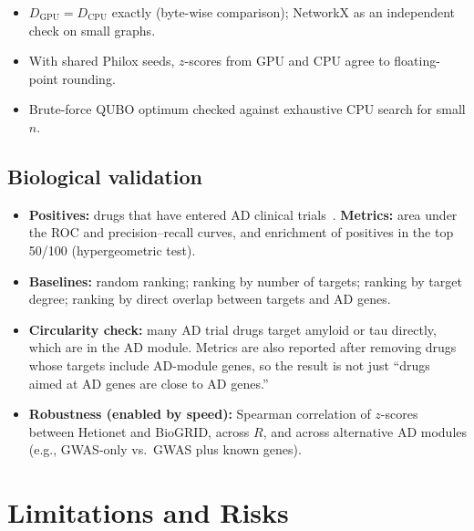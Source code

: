 \begin{itemize}[nosep]
  \item $D_{\text{GPU}} = D_{\text{CPU}}$ exactly (byte-wise comparison);
        NetworkX as an independent check on small graphs.
  \item With shared Philox seeds, $z$-scores from GPU and CPU agree to
        floating-point rounding.
  \item Brute-force QUBO optimum checked against exhaustive CPU search for
        small $n$.
\end{itemize}

\subsection{Biological validation}

\begin{itemize}[nosep]
  \item \textbf{Positives:} drugs that have entered AD clinical
        trials~\cite{cummings2024pipeline}. \textbf{Metrics:} area under the
        ROC and precision--recall curves, and enrichment of positives in the
        top 50/100 (hypergeometric test).
  \item \textbf{Baselines:} random ranking; ranking by number of targets;
        ranking by target degree; ranking by direct overlap between targets
        and AD genes.
  \item \textbf{Circularity check:} many AD trial drugs target amyloid or tau
        directly, which are in the AD module. Metrics are also reported after
        removing drugs whose targets include AD-module genes, so the result
        is not just ``drugs aimed at AD genes are close to AD genes.''
  \item \textbf{Robustness (enabled by speed):} Spearman correlation of
        $z$-scores between Hetionet and BioGRID, across $R$, and across
        alternative AD modules (e.g., GWAS-only vs.\ GWAS plus known genes).
\end{itemize}

\section{Limitations and Risks}
\label{app:limits}

